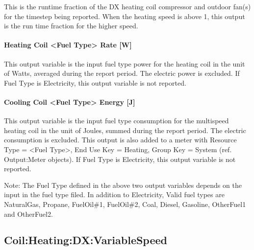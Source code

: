 This is the runtime fraction of the DX heating coil compressor and outdoor fan(s) for the timestep being reported. When the heating speed is above 1, this output is the run time fraction for the higher speed.

\paragraph{Heating Coil \textless{}Fuel Type\textgreater{} Rate {[}W{]}}\label{heating-coil-fuel-type-rate-w}

This output variable is the input fuel type power for the heating coil in the unit of Watts, averaged during the report period. The electric power is excluded. If Fuel Type is Electricity, this output variable is not reported.

\paragraph{Cooling Coil \textless{}Fuel Type\textgreater{} Energy {[}J{]}}\label{cooling-coil-fuel-type-energy-j-1}

This output variable is the input fuel type consumption for the multispeed heating coil in the unit of Joules, summed during the report period. The electric consumption is excluded. This output is also added to a meter with Resource Type = \textless{}Fuel Type\textgreater{}, End Use Key = Heating, Group Key = System (ref. Output:Meter objects). If Fuel Type is Electricity, this output variable is not reported.

Note: The Fuel Type defined in the above two output variables depends on the input in the fuel type filed. In addition to Electricity, Valid fuel types are NaturalGas, Propane, FuelOil\#1, FuelOil\#2, Coal, Diesel, Gasoline, OtherFuel1 and OtherFuel2.

\subsection{Coil:Heating:DX:VariableSpeed}\label{coilheatingdxvariablespeed}

